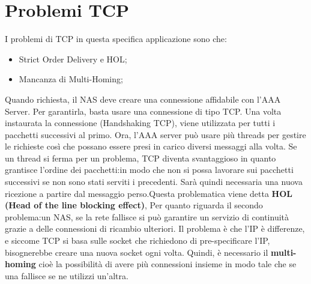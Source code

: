\documentclass{book}
\theoremstyle{remark}
\begin{document}
\section{Problemi TCP}
I problemi di TCP in questa specifica applicazione sono che:\begin{itemize}
	\item Strict Order Delivery e HOL;\@
	\item Mancanza di Multi-Homing;\@
\end{itemize}
Quando richiesta, il NAS deve creare una connessione affidabile con l'AAA Server\@. Per garantirla, basta usare una connessione di tipo TCP\@. Una volta instaurata la connessione (Handshaking TCP), viene utilizzata per tutti i pacchetti successivi al primo\@. Ora, l'AAA server può usare più threads per gestire le richieste così che possano essere presi in carico diversi messaggi alla volta\@. Se un thread si ferma per un problema, TCP diventa svantaggioso in quanto grantisce l'ordine dei pacchetti:\@fa in modo che non si possa lavorare sui pacchetti successivi se non sono stati serviti i precedenti\@. Sarà quindi necessaria una nuova ricezione a partire dal messaggio perso\@.\newline Questa problematica viene detta \textbf{HOL (Head of the line blocking effect)},\newline
Per quanto riguarda il secondo problema:\@preso un NAS, se la rete fallisce si può garantire un servizio di continuità grazie a delle connessioni di ricambio ulteriori\@. Il problema è che l'IP è differenze, e siccome TCP si basa sulle socket che richiedono di pre-specificare l'IP, bisognerebbe creare una nuova socket ogni volta\@. Quindi, è necessario il \textbf{multi-homing} cioè la possibilità di avere più connessioni insieme in modo tale che se una fallisce se ne utilizzi un'altra\@.
\end{document}
